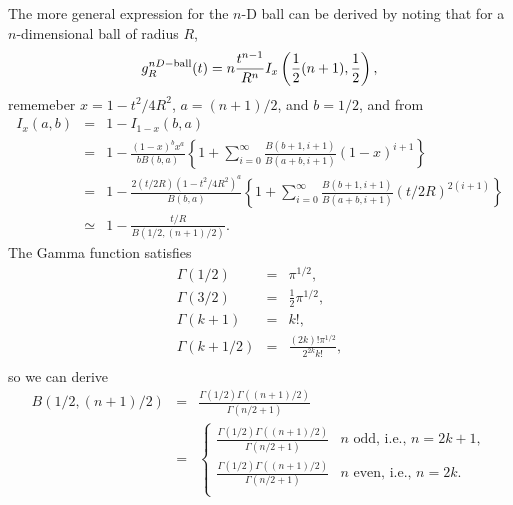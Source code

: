 \documentclass{article}
\begin{document}


The more general expression for the $n$-D ball can be derived by
noting that for a $n$-dimensional ball of radius $R$,
\begin{equation}
 g^{nD-{\rm ball}}_R(t) = n \frac{t^{n-1}}{R^n} I_x\left( 
  \frac{1}{2} (n+1), \frac{1}{2}
                      \right),
\end{equation}
rememeber $x = 1 - t^2/4R^2$, $a=(n+1)/2$, and $b=1/2$, and from
\cite[26.5.4]{Abramowitz_and_Stegun}
\begin{eqnarray}
  \label{eq:Ix}
  I_x(a,b)
 & = & 1 - I_{1-x}(b,a)
                    \nonumber \\
 & = & 1 - \frac{(1-x)^b x^a}{b B(b,a)}  \left\{ 
               1 +
               \sum_{i=0}^{\infty} \frac{B(b+1,i+1)}{B(a+b,i+1)} (1-x)^{i+1}
           \right\} 
               \nonumber \\
 & = & 1 - \frac{2 (t/2R) (1 - t^2/4R^2)^a}{B(b,a)}  \left\{ 
               1 +
               \sum_{i=0}^{\infty} \frac{B(b+1,i+1)}{B(a+b,i+1)} (t/2R)^{2(i+1)}
           \right\} 
               \nonumber \\
 & \simeq & 1 - \frac{t/R}{B(1/2,(n+1)/2)}.
\end{eqnarray}
The Gamma function satisfies\cite[6.1.12]{Abramowitz_and_Stegun}
\begin{eqnarray}
  \label{eq:gamma}
  \Gamma(1/2) & = & \pi^{1/2}, \\
  \Gamma(3/2) & = & \frac{1}{2} \pi^{1/2}, \\
  \Gamma(k+1) & = & k!, \\
  \Gamma(k+1/2) & = & \frac{(2k)! \pi^{1/2}}{2^{2k} k!}, \\
\end{eqnarray}
so we can derive
\begin{eqnarray}
  \label{eq:beta_specified_vals}
  B(1/2,(n+1)/2) & = & \frac{\Gamma(1/2) \Gamma((n+1)/2)}{\Gamma(n/2 + 1)} \nonumber \\
  & = & \left\{ \begin{array}{ll}
      \frac{\Gamma(1/2) \Gamma((n+1)/2)}{\Gamma(n/2 + 1)} & n \mbox{ odd, i.e., } n=2k+1,\\
      \frac{\Gamma(1/2) \Gamma((n+1)/2)}{\Gamma(n/2 + 1)} & n \mbox{ even, i.e., } n=2k.\\
    \end{array} \right.
\end{eqnarray}
\end{document}
